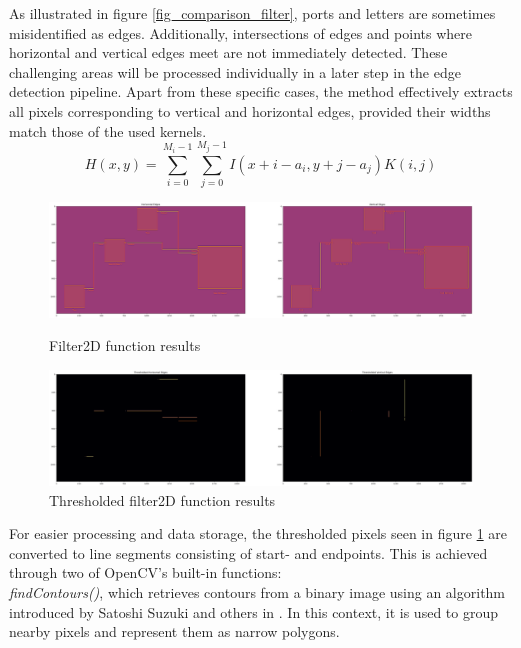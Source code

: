 As illustrated in figure \ref{fig_comparison_filter}, ports and letters are sometimes misidentified as edges. Additionally, intersections of edges and points where horizontal and vertical edges meet are not immediately detected. These challenging areas will be processed individually in a later step in the edge detection pipeline. Apart from these specific cases, the method effectively extracts all pixels corresponding to vertical and horizontal edges, provided their widths match those of the used kernels.
\begin{equation}
\label{eq_filter2D}
    H(x, y) = \sum_{i=0}^{M_i-1} \sum_{j=0}^{M_j-1} I(x + i - a_i,y + j - a_j)K(i, j)
\end{equation}

\newpage

\begin{figure}[htb]
    \centering
    \includegraphics[width=1\linewidth]{Pictures/filter2D.png}
    \caption{Filter2D function results}
    \label{fig_filter2d}

    \centering
    \includegraphics[width=1\linewidth]{Pictures/threshold.png}
    \caption{Thresholded filter2D function results}
    \label{fig_threshold}
\end{figure}
For easier processing and data storage, the thresholded pixels seen in figure \ref{fig_threshold} are converted to line segments consisting of start- and endpoints. This is achieved through two of OpenCV's built-in functions:\\
\textit{findContours()}, which retrieves contours from a binary image using an algorithm introduced by Satoshi Suzuki and others in \cite{art_findContours_algorithm}. In this context, it is used to group nearby pixels and represent them as narrow polygons.\\
